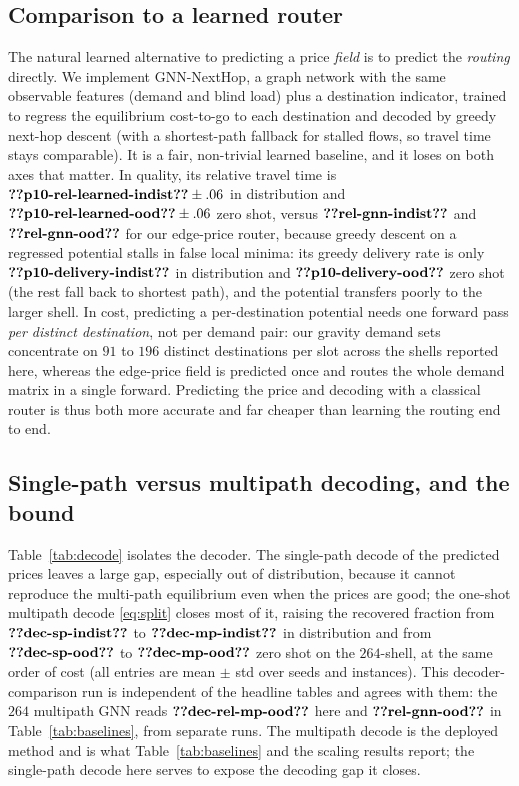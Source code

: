 \documentclass[journal]{IEEEtran}
\begin{document}
\subsection{Comparison to a learned router}
The natural learned alternative to predicting a price \emph{field} is to predict the
\emph{routing} directly. We implement GNN-NextHop, a graph network with the same observable
features (demand and blind load) plus a destination indicator, trained to regress the
equilibrium cost-to-go to each destination and decoded by greedy next-hop descent (with a
shortest-path fallback for stalled flows, so travel time stays comparable). It is a fair,
non-trivial learned baseline, and it loses on both axes that matter. In quality, its
relative travel time is $\clm{p10-rel-learned-indist}\pm.06$ in distribution and $\clm{p10-rel-learned-ood}\pm.06$ zero shot, versus
$\clm{rel-gnn-indist}$ and $\clm{rel-gnn-ood}$ for our edge-price router, because greedy descent on a regressed potential
stalls in false local minima: its greedy delivery rate is only $\clm{p10-delivery-indist}$ in distribution and
$\clm{p10-delivery-ood}$ zero shot (the rest fall back to shortest path), and the potential transfers poorly
to the larger shell. In cost, predicting a per-destination potential needs one forward pass
\emph{per distinct destination}, not per demand pair: our gravity demand sets concentrate on $91$ to $196$ distinct destinations per slot across the shells reported here, whereas the
edge-price field is predicted once and routes the whole demand matrix in a single forward.
Predicting the price and decoding with a classical router is thus both more accurate and far
cheaper than learning the routing end to end.



\subsection{Single-path versus multipath decoding, and the bound}\label{sec:results-decode}
Table~\ref{tab:decode} isolates the decoder. The single-path decode of the predicted
prices leaves a large gap, especially out of distribution, because it cannot reproduce
the multi-path equilibrium even when the prices are good; the one-shot multipath decode
\eqref{eq:split} closes most of it, raising the recovered fraction from $\clm{dec-sp-indist}$ to $\clm{dec-mp-indist}$ in
distribution and from $\clm{dec-sp-ood}$ to $\clm{dec-mp-ood}$ zero shot on the $264$-shell, at the same order of cost
(all entries are mean $\pm$ std over seeds and instances). This decoder-comparison run is
independent of the headline tables and agrees with them: the $264$ multipath GNN reads
$\clm{dec-rel-mp-ood}$ here and $\clm{rel-gnn-ood}$ in Table~\ref{tab:baselines}, from separate runs. The
multipath decode is the deployed method and is what Table~\ref{tab:baselines} and the
scaling results report; the single-path decode here serves to expose the decoding gap it
closes.
\end{document}
